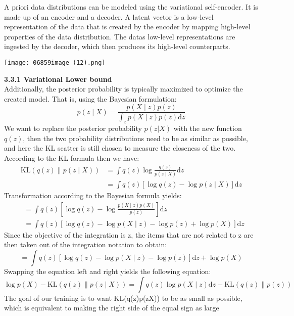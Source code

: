 \documentclass[
]{article}
\begin{document}
A priori data distributions can be modeled using the variational
self-encoder. It is made up of an encoder and a decoder. A latent vector
is a low-level representation of the data that is created by the encoder
by mapping high-level properties of the data distribution. The
data\textquotesingle s low-level representations are ingested by the
decoder, which then produces its high-level counterparts.

\texttt{[image: 06859image (12).png]}

{\bfseries \small 3.3.1 Variational Lower bound} \\
Additionally, the posterior probability is typically maximized to optimize the created model. That is, using the Bayesian formulation:
$$
p(z \mid X)=\frac{p(X \mid z) p(z)}{\int_z p(X \mid z) p(z) \mathrm{d} z}
$$
We want to replace the posterior probability \(p(z|X)\) with the new
function \(q(z)\), then the two probability distributions need to be as
similar as possible, and here the KL scatter is still chosen to measure
the closeness of the two. According to the KL formula then we have:
$$
\begin{aligned}
\mathrm{KL}(q(z) \| p(z \mid X)) & =\int q(z) \log \frac{q(z)}{p(z \mid X)} \mathrm{d} z \\
& =\int q(z)[\log q(z)-\log p(z \mid X)] \mathrm{d} z
\end{aligned}
$$
Transformation according to the Bayesian formula yields:
$$
\begin{aligned}
& =\int q(z)\left[\log q(z)-\log \frac{p(X \mid z) p(X)}{p(z)}\right] \mathrm{d} z \\
& =\int q(z)[\log q(z)-\log p(X \mid z)-\log p(z)+\log p(X)] \mathrm{d} z
\end{aligned}
$$
Since the objective of the integration is z, the items that are not
related to z are then taken out of the integration notation to obtain:
$$
=\int q(z)[\log q(z)-\log p(X \mid z)-\log p(z)] \mathrm{d} z+\log p(X)
$$
Swapping the equation left and right yields the following equation:
$$
\log p(X)-\mathrm{KL}(q(z) \| p(z \mid X))=\int q(z) \log p(X \mid z) \mathrm{d} z-\mathrm{KL}(q(z) \| p(z))
$$
The goal of our training is to want
KL(q(z)\textbar\textbar p(z\textbar X)) to be as small as possible,
which is equivalent to making the right side of the equal sign as large
\end{document}
